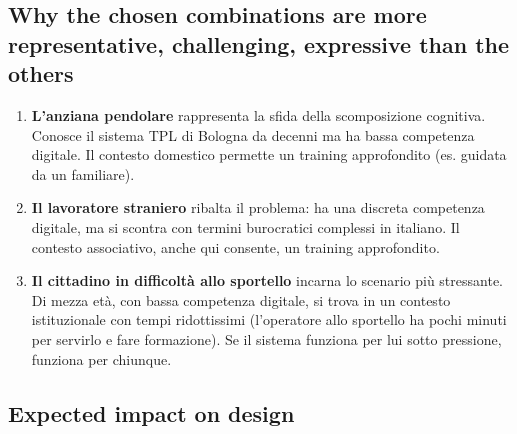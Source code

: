 \documentclass[11pt,a4paper]{article}
\begin{document}
\vspace{0.5cm}

\subsection{Why the chosen combinations are more representative, challenging, expressive than the others}

\begin{enumerate}[leftmargin=*]
    \item \textbf{L'anziana pendolare} rappresenta la sfida della scomposizione cognitiva. Conosce il sistema TPL di Bologna da decenni ma ha bassa competenza digitale. Il contesto domestico permette un training approfondito (es. guidata da un familiare).
    \item \textbf{Il lavoratore straniero} ribalta il problema: ha una discreta competenza digitale, ma si scontra con termini burocratici complessi in italiano. Il contesto associativo, anche qui consente, un training approfondito.
    \item \textbf{Il cittadino in difficoltà allo sportello} incarna lo scenario più stressante. Di mezza età, con bassa competenza digitale, si trova in un contesto istituzionale con tempi ridottissimi (l'operatore allo sportello ha pochi minuti per servirlo e fare formazione). Se il sistema funziona per lui sotto pressione, funziona per chiunque.
\end{enumerate}

\vspace{0.5cm}

\subsection{Expected impact on design}
\end{document}
